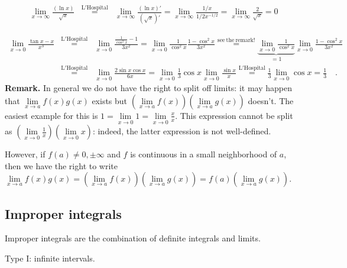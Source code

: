 \documentclass[12pt]{book}
\begin{document}
\[
\begin{array}{rcl}
\lim\limits_{x\to \infty} \frac{(\ln x)}{\sqrt{x}} &\stackrel{\mathrm{L'Hospital}}{=} & \lim\limits_{x\to \infty} \frac{(\ln x)'}{(\sqrt{x})'}=
 \lim\limits_{x\to \infty} \frac{1/x}{1/2x^{-1/2}}= \lim\limits_{x\to \infty} \frac{2}{\sqrt{x}}=0
\end{array}
\]

\[
\begin{array}{rcl}
\lim\limits_{x\to 0}\limits \frac{\tan x- x}{x^3}&\stackrel{\mathrm{L'Hospital}}{=} &\lim\limits_{x\to 0} \frac{\frac{1}{\cos^2 x}-1}{3x^2}=
\lim\limits_{x\to 0} \frac{1}{\cos^2x}\frac{1-\cos^2x}{3x^2}\stackrel{\mathrm{see~the~remark!}}{=}\underbrace{\lim\limits_{x\to 0} \frac{1}{\cos^2x}}_{=1} \lim\limits_{x\to 0} \frac{1-\cos^2x}{3x^2} \\
&\stackrel{\mathrm{L'Hospital}}{=}&\lim\limits_{x\to 0}\frac{2\sin x\cos x }{6x}= \lim\limits_{x\to 0}\frac 13\cos x\lim\limits_{x\to 0}\frac{\sin x}{x}\stackrel{\mathrm{L'Hospital}}{=}\frac 13\lim\limits_{x\to 0}\cos x= \frac 13\quad . 
\end{array}
\]
\textbf{Remark.} In general we do not have the right to split off limits: it may happen that $\lim\limits_{x\to a} f(x)g(x)$ exists but $ \left(\lim\limits_{x\to a} f(x)\right) \left(\lim\limits_{x\to a} g(x)\right)$ doesn't. The easiest example for this is $1=\lim\limits_{x\to 0} 1 =  \lim\limits_{x\to 0} \frac{x}{x}$. This expression cannot be split as $\left(\lim\limits_{x\to 0} \frac{1}{x}\right)\left(\lim\limits_{x\to 0} x \right)$: indeed, the latter expression is not well-defined.

However, if $f(a)\neq 0, \pm \infty$ and $f$ is continuous in a small neighborhood of $a$, then we have the right to write $\lim\limits_{x\to a} f(x)g(x)= \left(\lim\limits_{x\to a} f(x)\right) \left(\lim\limits_{x\to a} g(x)\right)= f(a)\left(\lim\limits_{x\to a} g(x)\right)$.

\subsection{Improper integrals} \label{secImproperIntegrals}
 Improper integrals are the combination of definite integrals and limits.

Type I: infinite intervals.
\end{document}

